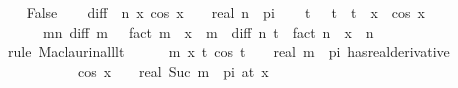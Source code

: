 \begin{isabellebody}
\ \ \isamarkupfalse%
\ False\isanewline
\ \ \isamarkupfalse%
\ {\isacharquery}{\kern0pt}diff\ {\isacharequal}{\kern0pt}\ {\isachardoublequoteopen}{\isasymlambda}n\ x{\isachardot}{\kern0pt}\ cos\ {\isacharparenleft}{\kern0pt}x\ {\isacharplus}{\kern0pt}\ {}{\isacharslash}{\kern0pt}{}\ {\isacharasterisk}{\kern0pt}\ real\ n\ {\isacharasterisk}{\kern0pt}\ pi{\isacharparenright}{\kern0pt}{\isachardoublequoteclose}\isanewline
\ \ \isamarkupfalse%
\ {\isachardoublequoteopen}{\isasymexists}t{\isachardot}{\kern0pt}\ {}\ {\isacharless}{\kern0pt}\ {\isasymbar}t{\isasymbar}\ {\isasymand}\ {\isasymbar}t{\isasymbar}\ {\isacharless}{\kern0pt}\ {\isasymbar}x{\isasymbar}\ {\isasymand}\ cos\ x\ {\isacharequal}{\kern0pt}\isanewline
\ \ \ \ \ \ {\isacharparenleft}{\kern0pt}{\isasymSum}m{\isacharless}{\kern0pt}n{\isachardot}{\kern0pt}\ {\isacharparenleft}{\kern0pt}{\isacharquery}{\kern0pt}diff\ m\ {}\ {\isacharslash}{\kern0pt}\ fact\ m{\isacharparenright}{\kern0pt}\ {\isacharasterisk}{\kern0pt}\ x\ {\isacharcircum}{\kern0pt}\ m{\isacharparenright}{\kern0pt}\ {\isacharplus}{\kern0pt}\ {\isacharparenleft}{\kern0pt}{\isacharquery}{\kern0pt}diff\ n\ t\ {\isacharslash}{\kern0pt}\ fact\ n{\isacharparenright}{\kern0pt}\ {\isacharasterisk}{\kern0pt}\ x\ {\isacharcircum}{\kern0pt}\ n{\isachardoublequoteclose}\isanewline
\ \ \isamarkupfalse%
\ {\isacharparenleft}{\kern0pt}rule\ Maclaurin{\isacharunderscore}{\kern0pt}all{\isacharunderscore}{\kern0pt}lt{\isacharparenright}{\kern0pt}\isanewline
\ \ \ \ \isamarkupfalse%
\ {\isachardoublequoteopen}{\isasymforall}m\ x{\isachardot}{\kern0pt}\ {\isacharparenleft}{\kern0pt}{\isacharparenleft}{\kern0pt}{\isasymlambda}t{\isachardot}{\kern0pt}\ cos\ {\isacharparenleft}{\kern0pt}t\ {\isacharplus}{\kern0pt}\ {}{\isacharslash}{\kern0pt}{}\ {\isacharasterisk}{\kern0pt}\ real\ m\ {\isacharasterisk}{\kern0pt}\ pi{\isacharparenright}{\kern0pt}{\isacharparenright}{\kern0pt}\ has{\isacharunderscore}{\kern0pt}real{\isacharunderscore}{\kern0pt}derivative\isanewline
\ \ \ \ \ \ \ \ \ \ \ cos\ {\isacharparenleft}{\kern0pt}x\ {\isacharplus}{\kern0pt}\ {}{\isacharslash}{\kern0pt}{}\ {\isacharasterisk}{\kern0pt}\ real\ {\isacharparenleft}{\kern0pt}Suc\ m{\isacharparenright}{\kern0pt}\ {\isacharasterisk}{\kern0pt}\ pi{\isacharparenright}{\kern0pt}{\isacharparenright}{\kern0pt}\ {\isacharparenleft}{\kern0pt}at\ x{\isacharparenright}{\kern0pt}{\isachardoublequoteclose}\isanewline
\ \ \ \ \ \ \isamarkupfalse%

\end{isabellebody}
